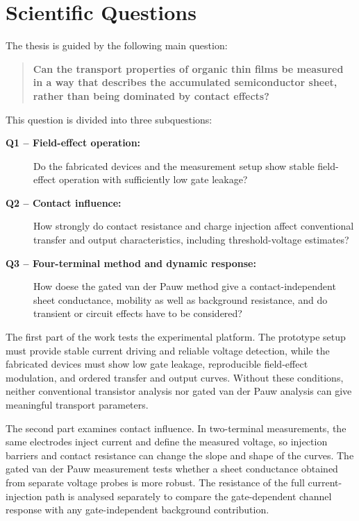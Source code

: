 \section{Scientific Questions}
\label{sec:scientific_questions}

The thesis is guided by the following main question:

\begin{quote}
\textbf{Can the transport properties of organic thin films be measured
in a way that describes the accumulated semiconductor sheet, rather than being
dominated by contact effects?}
\end{quote}

This question is divided into three subquestions:
\begin{description}
    \item[\textbf{Q1 -- Field-effect operation:}] Do the fabricated devices and
    the measurement setup show stable field-effect operation with sufficiently
    low gate leakage?
    \item[\textbf{Q2 -- Contact influence:}] How strongly do contact resistance
    and charge injection affect conventional transfer and output characteristics,
    including threshold-voltage estimates?
    \item[\textbf{Q3 -- Four-terminal method and dynamic response:}] How doese the gated van
    der Pauw method give a  contact-independent sheet conductance,
    mobility as well as background
    resistance, and do transient or circuit effects have to be considered?
\end{description}

The first part of the work tests the experimental platform. The prototype setup
must provide stable current driving and reliable voltage detection, while the
fabricated devices must show low gate leakage, reproducible field-effect
modulation, and ordered transfer and output curves. Without these conditions,
neither conventional transistor analysis nor gated van der Pauw analysis can give
meaningful transport parameters.

The second part examines contact influence. In two-terminal measurements, the
same electrodes inject current and define the measured voltage, so injection
barriers and contact resistance can change the slope and shape of the curves. The
gated van der Pauw measurement tests whether a sheet conductance obtained from
separate voltage probes is more robust. The resistance of the full
current-injection path is analysed separately to compare the gate-dependent
channel response with any gate-independent background contribution.

